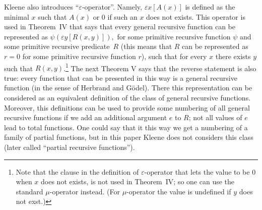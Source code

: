 \documentclass[12pt]{article}
\theoremstyle{remark}
\let\eps=\varepsilon
\begin{document}
Kleene also introduces ``$\eps$-operator''. Namely, $\eps x [A(x)]$ is defined as the minimal $x$ such that $A(x)$ or $0$ if such an $x$ does not exists. This operator is used in Theorem~IV that says that every general recursive function can be represented as
\(
\psi(\eps y [R(x,y)]),
\)
for some primitive recursive function $\psi$ and some primitive recursive predicate~$R$ (this means that $R$ can be represented as $r=0$ for some primitive recursive function $r$), such that for every $x$ there exists $y$ such that $R(x,y)$.\footnote{Note that the clause in the definition of $\eps$-operator that lets the value to be $0$ when $x$ does not exists, is not used in Theorem~IV; so one can use the standard $\mu$-operator instead. (For $\mu$-operator the value is undefined if $y$ does not exst.)}  The next Theorem V says that the reverse statement is also true: every function that can be presented in this way is a general recursive function (in the sense of Herbrand and G\"{o}del). There this representation can be considered as an equivalent definition of the class of general recursive functions. Moreover, this definitions can be used to provide some numbering of all general recursive functions if we add an additional argument $e$ to $R$; not all values of $e$ lead to total functions. One could say that it this way we get a numbering of a family of partial functions, but in this paper Kleene does not considers this class (later called ``partial recursive functions'').
\end{document}

